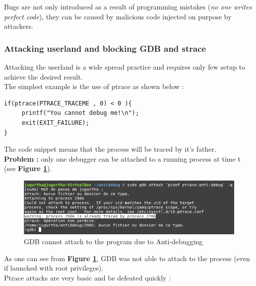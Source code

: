 Bugs are not only introduced as a result of programming mistakes (\textit{no one writes perfect code}), they can be caused by malicious code injected on purpose by attackers.

\subsubsection{Attacking userland and blocking GDB and strace}
Attacking the userland is a wide spread practice and requires only few setup to achieve the desired result.\\

The simplest example is the use of ptrace as shown below :
	\begin{lstlisting}[style=CStyle]
if(ptrace(PTRACE_TRACEME , 0) < 0 ){
     printf("You cannot debug me!\n");
     exit(EXIT_FAILURE);
}
    	\end{lstlisting}
The code snippet means that the process will be traced by it's father. \\

\textbf{\color{red}Problem : } only one debugger can be attached to a running process at time t (see \textbf{Figure \ref{GDB cannot attach to the program due to Anti-debugging}}).
    		\begin{figure}[H]
					\centering
        			\includegraphics[scale=0.5]{img/solution/gdb-cannot-be-attached.png}
        			\caption{GDB cannot attach to the program due to Anti-debugging}
        			\label{GDB cannot attach to the program due to Anti-debugging}
   			 \end{figure}
   			 As one can see from \textbf{Figure \ref{GDB cannot attach to the program due to Anti-debugging}}, GDB was not able to attach to the process (even if launched with root privileges).\\
   			 
Ptrace attacks are very basic and be defeated quickly :




